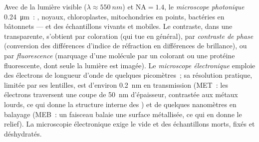 \begin{proposition}\label{prop:b1:cell-unit-of-life:microscopes}
Avec de la lumière visible ($\lambda \approx \qty{550}{nm}$) et
$\mathrm{NA} = 1.4$, le \emph{microscope
photonique}  \qty{0.24}{\micro m}~:
, noyaux, chloroplastes, mitochondries en points, bactéries en
bâtonnets --- et des échantillons vivants et mobiles. Le contraste,
dans une  transparente, s'obtient par coloration (qui tue en
général), par \emph{contraste de phase} (conversion des différences
d'indice de réfraction en différences de brillance), ou par
\emph{fluorescence} (marquage d'une molécule par un colorant ou une
protéine fluorescente, dont seule la lumière est imagée). Le
\emph{microscope électronique} emploie
des électrons de longueur d'onde de quelques picomètres~; sa résolution
pratique, limitée par ses lentilles, est d'environ \qty{0.2}{nm} en
transmission (MET~: les électrons traversent une coupe de \qty{50}{nm}
d'épaisseur, contrastée aux métaux lourds, ce qui donne la structure
interne des ) et de quelques nanomètres en balayage (MEB~: un
faisceau balaie une surface métallisée, ce qui en donne le relief). La
microscopie électronique exige le vide et des échantillons morts, fixés
et déshydratés.
\end{proposition}

